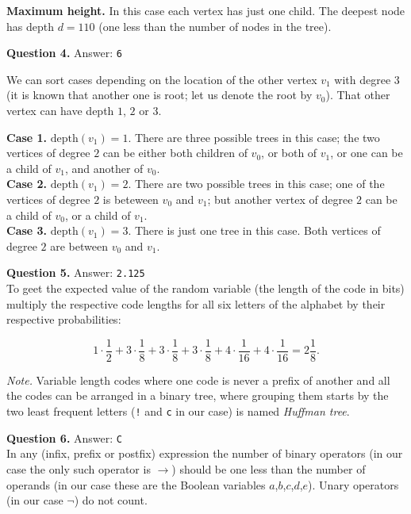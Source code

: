 \documentclass[jou]{apa6}
\begin{document}
{\bf Maximum height.} In this case each vertex has just one child. 
The deepest node has depth $d=110$ (one less than the number of nodes
in the tree). 


\vspace{4pt}
{\bf Question 4.} Answer: {\tt 6}

We can sort cases depending on the location of the other vertex $v_1$
with degree $3$ (it is known that another one is root; let us denote the root by $v_0$).
That other vertex can have depth $1$, $2$ or $3$.  

{\bf Case 1.} $\text{depth}(v_1) = 1$. There are three possible trees in this case; 
the two vertices of degree $2$ can be either both children of $v_0$, or both of $v_1$, 
or one can be a child of $v_1$, and another of $v_0$.\\
{\bf Case 2.}  $\text{depth}(v_1) = 2$. There are two possible trees in this case; 
one of the vertices of degree $2$ is beteween $v_0$ and $v_1$; but another vertex
of degree $2$ can be a child of $v_0$, or a child of $v_1$.\\
{\bf Case 3.} $\text{depth}(v_1) = 3$. There is just one tree in this case. 
Both vertices of degree $2$ are between $v_0$ and $v_1$. 






\vspace{4pt}
{\bf Question 5.} Answer: {\tt 2.125} \\
To geet the expected value of the random variable (the length of the code in bits)
multiply the respective code lengths for all six letters of the alphabet
by their respective probabilities: 

$$1 \cdot \frac{1}{2} + 3 \cdot \frac{1}{8} + 3 \cdot \frac{1}{8} + 3 \cdot \frac{1}{8} + 4 \cdot \frac{1}{16} + 4 \cdot \frac{1}{16} = 2\frac{1}{8}.$$

{\em Note.} Variable length codes where one code is never a prefix of another and
all the codes can be arranged in a binary tree, where grouping them starts by the two least frequent letters
({\tt !} and {\tt c} in our case) is named {\em Huffman tree}. 

\vspace{4pt}
{\bf Question 6.} Answer: {\tt C}\\
In any (infix, prefix or postfix) expression the number of binary operators (in our case the only 
such operator is $\rightarrow$) should be one less than the number of operands (in our case 
these are the Boolean variables $a$,$b$,$c$,$d$,$e$). Unary operators (in our case $\neg$) do not count. 
\end{document}
